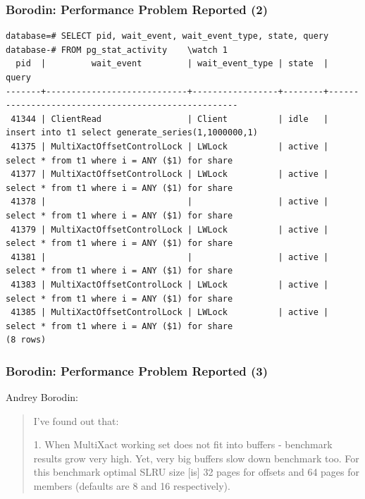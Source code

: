 \begin{frame}[fragile]
  \frametitle{Borodin: Performance Problem Reported (2)}

  \linksize
  \begin{verbatim}
database=# SELECT pid, wait_event, wait_event_type, state, query
database-# FROM pg_stat_activity    \watch 1
  pid  |         wait_event         | wait_event_type | state  |                       query
-------+----------------------------+-----------------+--------+----------------------------------------------------
 41344 | ClientRead                 | Client          | idle   | insert into t1 select generate_series(1,1000000,1)
 41375 | MultiXactOffsetControlLock | LWLock          | active | select * from t1 where i = ANY ($1) for share
 41377 | MultiXactOffsetControlLock | LWLock          | active | select * from t1 where i = ANY ($1) for share
 41378 |                            |                 | active | select * from t1 where i = ANY ($1) for share
 41379 | MultiXactOffsetControlLock | LWLock          | active | select * from t1 where i = ANY ($1) for share
 41381 |                            |                 | active | select * from t1 where i = ANY ($1) for share
 41383 | MultiXactOffsetControlLock | LWLock          | active | select * from t1 where i = ANY ($1) for share
 41385 | MultiXactOffsetControlLock | LWLock          | active | select * from t1 where i = ANY ($1) for share
(8 rows)
\end{verbatim}  
\end{frame}

\begin{frame}
  \frametitle{Borodin: Performance Problem Reported (3)}

  Andrey Borodin:
  \begin{quote}
I've found out that:

1. When MultiXact working set does not fit into buffers - benchmark results grow very high. Yet, very big buffers slow down benchmark
    too. For this benchmark optimal SLRU size [is] 32 pages for offsets and 64 pages for members (defaults are 8 and 16 respectively).
  \end{quote}

\end{frame}


